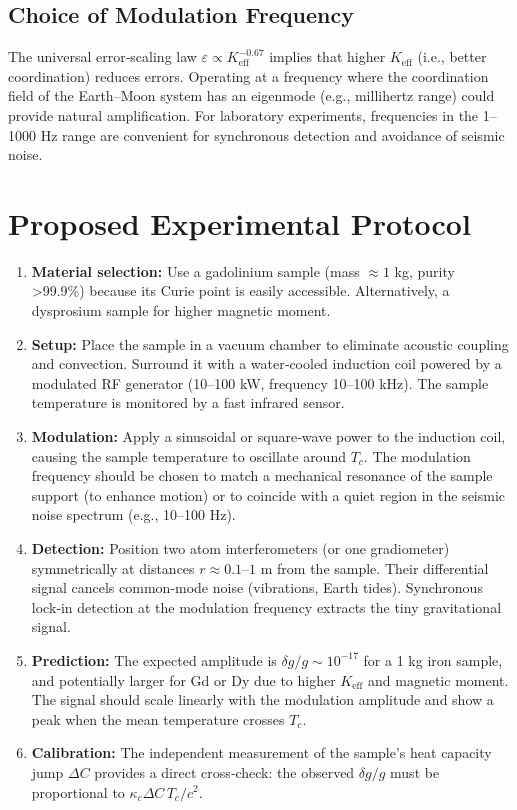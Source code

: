 \documentclass[12pt,a4paper]{article}
\newcommand{\Keff}{K_{\mathrm{eff}}}
\newcommand{\kappac}{\kappa_c}
\newcommand{\eps}{\varepsilon}
\begin{document}
	\subsection{Choice of Modulation Frequency}
	
	The universal error‑scaling law \(\eps \propto \Keff^{-0.67}\) implies that higher \(\Keff\) (i.e., better coordination) reduces errors. Operating at a frequency where the coordination field of the Earth–Moon system has an eigenmode (e.g., millihertz range) could provide natural amplification. For laboratory experiments, frequencies in the 1–1000 Hz range are convenient for synchronous detection and avoidance of seismic noise.
	
	\section{Proposed Experimental Protocol}
	\label{sec:experiment}
	
	\begin{enumerate}
		\item \textbf{Material selection:} Use a gadolinium sample (mass \(\approx 1\) kg, purity >99.9\%) because its Curie point is easily accessible. Alternatively, a dysprosium sample for higher magnetic moment.
		\item \textbf{Setup:} Place the sample in a vacuum chamber to eliminate acoustic coupling and convection. Surround it with a water‑cooled induction coil powered by a modulated RF generator (10–100 kW, frequency 10–100 kHz). The sample temperature is monitored by a fast infrared sensor.
		\item \textbf{Modulation:} Apply a sinusoidal or square‑wave power to the induction coil, causing the sample temperature to oscillate around \(T_c\). The modulation frequency should be chosen to match a mechanical resonance of the sample support (to enhance motion) or to coincide with a quiet region in the seismic noise spectrum (e.g., 10–100 Hz).
		\item \textbf{Detection:} Position two atom interferometers (or one gradiometer) symmetrically at distances \(r \approx 0.1\)–\(1\) m from the sample. Their differential signal cancels common‑mode noise (vibrations, Earth tides). Synchronous lock‑in detection at the modulation frequency extracts the tiny gravitational signal.
		\item \textbf{Prediction:} The expected amplitude is \(\delta g/g \sim 10^{-17}\) for a 1 kg iron sample, and potentially larger for Gd or Dy due to higher \(\Keff\) and magnetic moment. The signal should scale linearly with the modulation amplitude and show a peak when the mean temperature crosses \(T_c\).
		\item \textbf{Calibration:} The independent measurement of the sample's heat capacity jump \(\Delta C\) provides a direct cross‑check: the observed \(\delta g/g\) must be proportional to \(\kappac \Delta C \, T_c / c^2\).
	\end{enumerate}
	
\end{document}
